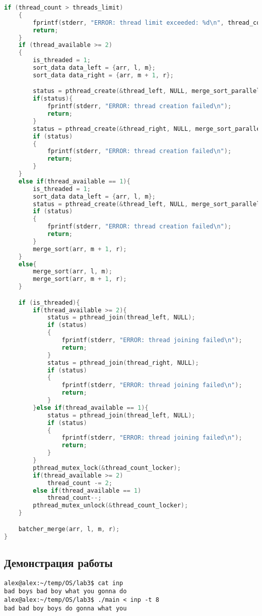 \documentclass[12pt]{article}
\begin{document}
\begin{lstlisting}[language=C, basicstyle=\scriptsize]
    if (thread_count > threads_limit)
    {
        fprintf(stderr, "ERROR: thread limit exceeded: %d\n", thread_count);
        return;
    }
    if (thread_available >= 2)
    {
        is_threaded = 1;
        sort_data data_left = {arr, l, m};
        sort_data data_right = {arr, m + 1, r};

        status = pthread_create(&thread_left, NULL, merge_sort_parallel, &data_left);
        if(status){
            fprintf(stderr, "ERROR: thread creation failed\n");
            return;
        }
        status = pthread_create(&thread_right, NULL, merge_sort_parallel, &data_right);
        if (status)
        {
            fprintf(stderr, "ERROR: thread creation failed\n");
            return;
        }
    }
    else if(thread_available == 1){
        is_threaded = 1;
        sort_data data_left = {arr, l, m};
        status = pthread_create(&thread_left, NULL, merge_sort_parallel, &data_left);
        if (status)
        {
            fprintf(stderr, "ERROR: thread creation failed\n");
            return;
        }
        merge_sort(arr, m + 1, r);
    }
    else{
        merge_sort(arr, l, m);
        merge_sort(arr, m + 1, r);
    }

    if (is_threaded){
        if(thread_available >= 2){
            status = pthread_join(thread_left, NULL);
            if (status)
            {
                fprintf(stderr, "ERROR: thread joining failed\n");
                return;
            }
            status = pthread_join(thread_right, NULL);
            if (status)
            {
                fprintf(stderr, "ERROR: thread joining failed\n");
                return;
            }
        }else if(thread_available == 1){
            status = pthread_join(thread_left, NULL);
            if (status)
            {
                fprintf(stderr, "ERROR: thread joining failed\n");
                return;
            }
        }
        pthread_mutex_lock(&thread_count_locker);
        if(thread_available >= 2)
            thread_count -= 2;
        else if(thread_available == 1)
            thread_count--;
        pthread_mutex_unlock(&thread_count_locker);
    }

    batcher_merge(arr, l, m, r);
}
\end{lstlisting}

\subsection*{Демонстрация работы}

\begin{lstlisting}[basicstyle=\scriptsize]
alex@alex:~/temp/OS/lab3$ cat inp
bad boys bad boy what you gonna do
alex@alex:~/temp/OS/lab3$ ./main < inp -t 8
bad bad boy boys do gonna what you
\end{lstlisting}
\end{document}
